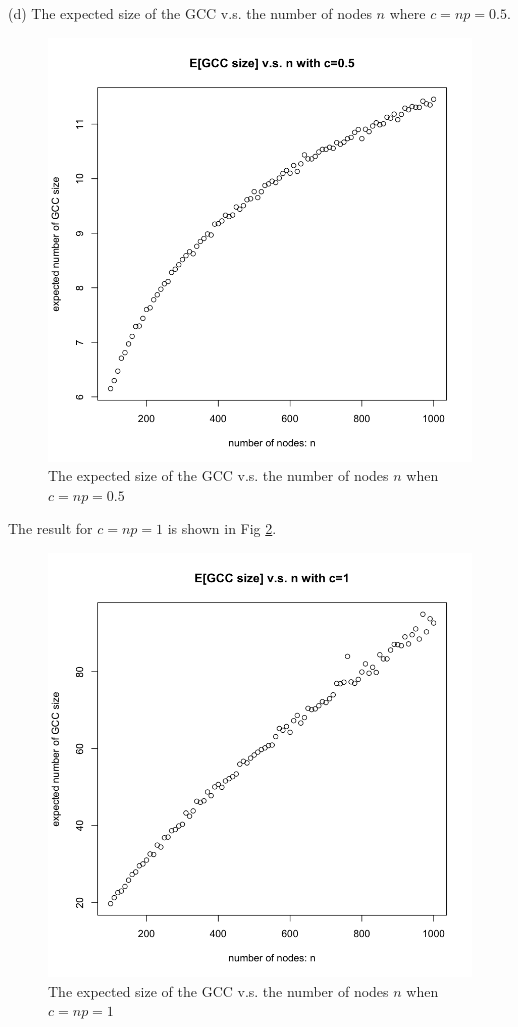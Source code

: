 \documentclass[draftcls,12pt,onecolumn]{IEEEtran}
\begin{document}
(d) The expected size of the GCC v.s. the number of nodes $n$ where $c=np=0.5$. 
\begin{figure}[H]
\centering
\includegraphics[scale=0.3]{figures_part1_1/output_20_0.png}
\caption{The expected size of the GCC v.s. the number of nodes $n$ when $c=np=0.5$}
\label{fig12}
\end{figure}

The result for $c=np=1$ is shown in Fig \ref{fig13}.
\begin{figure}[H]
\centering
\includegraphics[scale=0.3]{figures_part1_1/output_22_0.png}
\caption{The expected size of the GCC v.s. the number of nodes $n$ when $c=np=1$}
\label{fig13}
\end{figure}
\end{document}
